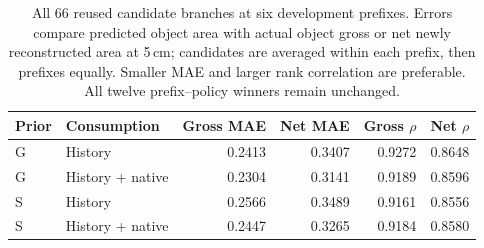 \begin{table}[!htbp]
\centering\small
\caption{All 66 reused candidate branches at six development prefixes. Errors compare predicted object area with actual object gross or net newly reconstructed area at 5\,cm; candidates are averaged within each prefix, then prefixes equally. Smaller MAE and larger rank correlation are preferable. All twelve prefix--policy winners remain unchanged.}
\label{tab:gain-replay}
\begin{tabular}{llrrrr}
\toprule
Prior & Consumption & Gross MAE & Net MAE & Gross $\rho$ & Net $\rho$ \\
\midrule
G & History & 0.2413 & 0.3407 & 0.9272 & 0.8648 \\
G & History + native & 0.2304 & 0.3141 & 0.9189 & 0.8596 \\
S & History & 0.2566 & 0.3489 & 0.9161 & 0.8556 \\
S & History + native & 0.2447 & 0.3265 & 0.9184 & 0.8580 \\
\bottomrule
\end{tabular}
\end{table}
